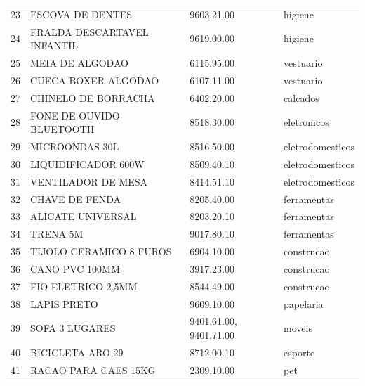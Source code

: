 \begin{apendicesenv}
\begin{center}
\begin{longtable}{r p{6.6cm} p{4.4cm} p{2.6cm}}
23 & ESCOVA DE DENTES & 9603.21.00 & higiene \\
24 & FRALDA DESCARTAVEL INFANTIL & 9619.00.00 & higiene \\
25 & MEIA DE ALGODAO & 6115.95.00 & vestuario \\
26 & CUECA BOXER ALGODAO & 6107.11.00 & vestuario \\
27 & CHINELO DE BORRACHA & 6402.20.00 & calcados \\
28 & FONE DE OUVIDO BLUETOOTH & 8518.30.00 & eletronicos \\
29 & MICROONDAS 30L & 8516.50.00 & eletrodomesticos \\
30 & LIQUIDIFICADOR 600W & 8509.40.10 & eletrodomesticos \\
31 & VENTILADOR DE MESA & 8414.51.10 & eletrodomesticos \\
32 & CHAVE DE FENDA & 8205.40.00 & ferramentas \\
33 & ALICATE UNIVERSAL & 8203.20.10 & ferramentas \\
34 & TRENA 5M & 9017.80.10 & ferramentas \\
35 & TIJOLO CERAMICO 8 FUROS & 6904.10.00 & construcao \\
36 & CANO PVC 100MM & 3917.23.00 & construcao \\
37 & FIO ELETRICO 2,5MM & 8544.49.00 & construcao \\
38 & LAPIS PRETO & 9609.10.00 & papelaria \\
39 & SOFA 3 LUGARES & 9401.61.00, 9401.71.00 & moveis \\
40 & BICICLETA ARO 29 & 8712.00.10 & esporte \\
41 & RACAO PARA CAES 15KG & 2309.10.00 & pet \\
\end{longtable}
\end{center}


\end{apendicesenv}
